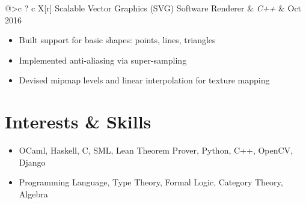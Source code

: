 \documentclass[12pt]{article}
\begin{document}
\begin{tabu}{@{}>{\bfseries}c ? c X[r]}
Scalable Vector Graphics (SVG) Software Renderer & \emph{C++} & Oct 2016
\end{tabu}
\vspace{-5pt}

\begin{itemize}
\itemsep-2pt
\item Built support for basic shapes: points, lines, triangles
\item Implemented anti-aliasing via super-sampling
\item Devised mipmap levels and linear interpolation for texture mapping
\end{itemize}

\section{Interests \& Skills}

\begin{itemize}
\itemsep-2pt
\item OCaml, Haskell, C, SML, Lean Theorem Prover, Python, C++, OpenCV, Django
\item Programming Language, Type Theory, Formal Logic, Category Theory, Algebra
\end{itemize}
\end{document}
